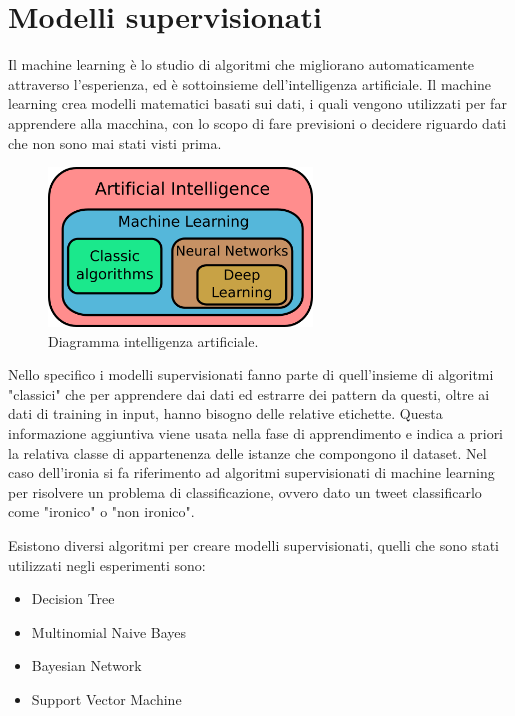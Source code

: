 \documentclass[oneside]{book}
\begin{document}
\section{Modelli supervisionati}
Il machine learning è lo studio di algoritmi che migliorano automaticamente attraverso l'esperienza, ed è sottoinsieme dell'intelligenza artificiale. Il machine learning crea modelli matematici basati sui dati, i quali vengono utilizzati per far apprendere alla macchina, con lo scopo di fare previsioni o decidere riguardo dati che non sono mai stati visti prima.


\begin{figure}[!h]
	\centering
	\includegraphics[width=7cm]{assets/ai_diagram.png}
	\caption[Caption for LOF]{Diagramma intelligenza artificiale.\footnotemark}
	\label{fig:artificial-intelligence}
\end{figure}


Nello specifico i modelli supervisionati fanno parte di quell'insieme di algoritmi "classici" che per apprendere dai dati ed estrarre dei pattern da questi, oltre ai dati di training in input, hanno bisogno delle relative etichette. Questa informazione aggiuntiva viene usata nella fase di apprendimento e indica a priori la relativa classe di appartenenza delle istanze che compongono il dataset. Nel caso dell'ironia si fa riferimento ad algoritmi supervisionati di machine learning per risolvere un problema di classificazione, ovvero dato un tweet classificarlo come "ironico" o "non ironico".

Esistono diversi algoritmi per creare modelli supervisionati, quelli che sono stati utilizzati negli esperimenti sono:
\begin{itemize}
	\item Decision Tree
	\item Multinomial Naive Bayes
	\item Bayesian Network
	\item Support Vector Machine
\end{itemize}
\end{document}
